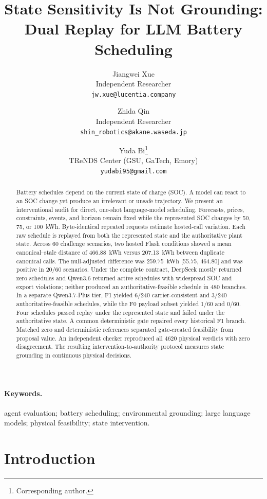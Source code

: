 \documentclass[11pt]{article}
\title{\vspace{-1.0em}State Sensitivity Is Not Grounding:\\
Dual Replay for LLM Battery Scheduling}
\author{%
Jiangwei Xue\\
\small Independent Researcher\\
\small \texttt{jw.xue@lucentia.company}
\and
Zhida Qin\\
\small Independent Researcher\\
\small \texttt{shin\_robotics@akane.waseda.jp}
\and
Yuda Bi\thanks{Corresponding author.}\\
\small TReNDS Center (GSU, GaTech, Emory)\\
\small \texttt{yudabi95@gmail.com}%
}
\date{%
\vspace{-0.6em}\small
DOI: \href{https://doi.org/10.5281/zenodo.22707487}{\textcolor{black}{10.5281/zenodo.22707487}}\\[0.45em]
\begin{minipage}{0.94\textwidth}
\centering\footnotesize
\textcopyright{} 2026 The Authors. This preprint is licensed under the
\href{https://creativecommons.org/licenses/by/4.0/}{\textcolor{black}{Creative Commons Attribution 4.0 International License (CC BY 4.0)}}.
\end{minipage}%
}
\newcommand{\EIICS}{466.88}
\newcommand{\EIINull}{207.13}
\newcommand{\EIIAdjusted}{259.75}
\newcommand{\EIIAdjustedLow}{55.75}
\newcommand{\EIIAdjustedHigh}{464.80}
\newcommand{\EIIPositive}{20}
\newcommand{\PhysicsComparisons}{4620}
\begin{document}
\maketitle
\vspace{-1.2em}
\begin{abstract}
Battery schedules depend on the current state of charge (SOC). A model can react to an SOC change
yet produce an irrelevant or unsafe trajectory. We present an interventional audit for direct,
one-shot language-model scheduling. Forecasts, prices, constraints, events, and horizon remain
fixed while the represented SOC changes by 50, 75, or 100~kWh. Byte-identical repeated requests
estimate hosted-call variation. Each raw schedule is replayed from both the represented state and
the authoritative plant state. Across 60 challenge scenarios, two hosted Flash conditions
showed a mean canonical--stale distance of \EIICS{}~kWh versus \EIINull{}~kWh between duplicate
canonical calls. The null-adjusted difference was \EIIAdjusted{}~kWh
[\EIIAdjustedLow{}, \EIIAdjustedHigh{}] and was positive in \EIIPositive{}/60 scenarios. Under the
complete contract, DeepSeek mostly returned zero schedules and Qwen3.6 returned active schedules
with widespread SOC and export violations; neither produced an authoritative-feasible schedule in
480 branches. In a separate Qwen3.7-Plus tier, F1 yielded 6/240 carrier-consistent and 3/240
authoritative-feasible schedules, while the F0 payload subset yielded 1/60 and 0/60. Four schedules
passed replay under the represented state and failed under the authoritative state. A common
deterministic gate repaired every historical F1 branch. Matched zero and deterministic references
separated gate-created feasibility from proposal value. An independent checker reproduced all
\PhysicsComparisons{} physical verdicts with zero disagreement. The resulting
intervention-to-authority protocol measures state grounding in continuous physical decisions.
\end{abstract}

\paragraph{Keywords.} agent evaluation; battery scheduling; environmental grounding; large language models; physical feasibility; state intervention.

\section{Introduction}
\label{sec:introduction}
\end{document}
